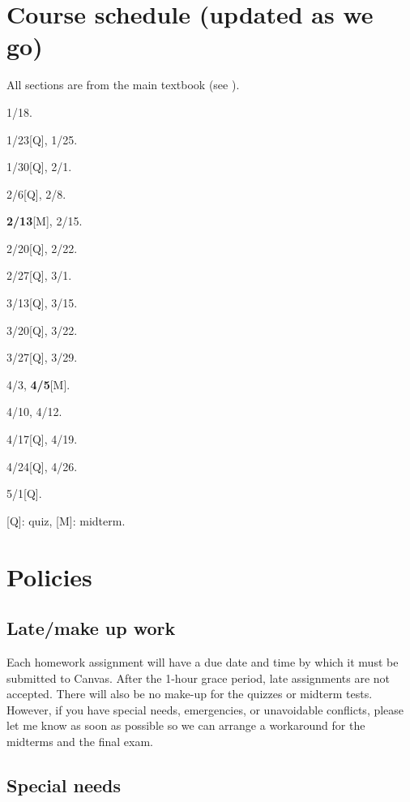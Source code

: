 \documentclass[oneside,11pt]{amsart}
\begin{document}
\section{Course schedule (updated as we go)}

All sections are from the main textbook (see ).

\medskip
\begin{enumerate}[\bf{}{[}week 1{]}]
	\item 1/18.
	\item 1/23[Q], 1/25.
	\item 1/30[Q], 2/1.
	\item 2/6[Q], 2/8.
	\item \textbf{2/13}[M], 2/15.
	\item 2/20[Q], 2/22.
	\item 2/27[Q], 3/1.
	\item 3/13[Q], 3/15.
	\item 3/20[Q], 3/22.
	\item 3/27[Q], 3/29.
	\item 4/3, \textbf{4/5}[M].
	\item 4/10, 4/12.
	\item 4/17[Q], 4/19.
	\item 4/24[Q], 4/26.
	\item 5/1[Q].
\end{enumerate}

\medskip

[Q]: quiz, [M]: midterm.

\section{Policies}

\subsection{Late/make up work} 

Each homework assignment will have a due date and time by which it must be submitted to Canvas.  After the 1-hour grace period, late assignments are not accepted.  There will also be no make-up for the quizzes or midterm tests.  However, if you have special needs, emergencies, or unavoidable conflicts, please let me know as soon as possible so we can arrange a workaround for the midterms and the final exam.

\subsection{Special needs}
\end{document}

